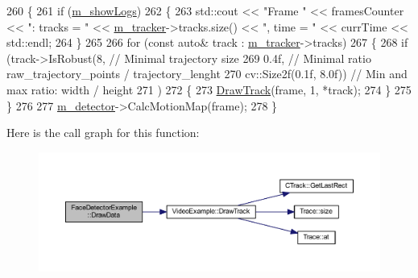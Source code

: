 \begin{DoxyCode}
260     \{
261         \textcolor{keywordflow}{if} (\mbox{\hyperlink{class_video_example_af3bfe51e3e1452bb084016602c668463}{m\_showLogs}})
262         \{
263             std::cout << \textcolor{stringliteral}{"Frame "} << framesCounter << \textcolor{stringliteral}{": tracks = "} << \mbox{\hyperlink{class_video_example_a7c58cd8c883981b2e645d1a3d8edf76a}{m\_tracker}}->tracks.size() <<
       \textcolor{stringliteral}{", time = "} << currTime << std::endl;
264         \}
265 
266         \textcolor{keywordflow}{for} (\textcolor{keyword}{const} \textcolor{keyword}{auto}& track : \mbox{\hyperlink{class_video_example_a7c58cd8c883981b2e645d1a3d8edf76a}{m\_tracker}}->tracks)
267         \{
268             \textcolor{keywordflow}{if} (track->IsRobust(8,                           \textcolor{comment}{// Minimal trajectory size}
269                                 0.4f,                        \textcolor{comment}{// Minimal ratio raw\_trajectory\_points /
       trajectory\_lenght}
270                                 cv::Size2f(0.1f, 8.0f))      \textcolor{comment}{// Min and max ratio: width / height}
271                     )
272             \{
273                 \mbox{\hyperlink{class_video_example_a84a040bc87b915c5ee18c5d11235f40c}{DrawTrack}}(frame, 1, *track);
274             \}
275         \}
276 
277         \mbox{\hyperlink{class_video_example_a00fee4b18b68d605b87051f3bdaa1c92}{m\_detector}}->CalcMotionMap(frame);
278     \}
\end{DoxyCode}
Here is the call graph for this function\+:\nopagebreak
\begin{figure}[H]
\begin{center}
\leavevmode
\includegraphics[width=350pt]{class_face_detector_example_a13af0e89b24ef94ac5f5249ff387d40a_cgraph}
\end{center}
\end{figure}
\mbox{\label{class_video_example_a84a040bc87b915c5ee18c5d11235f40c}} 
